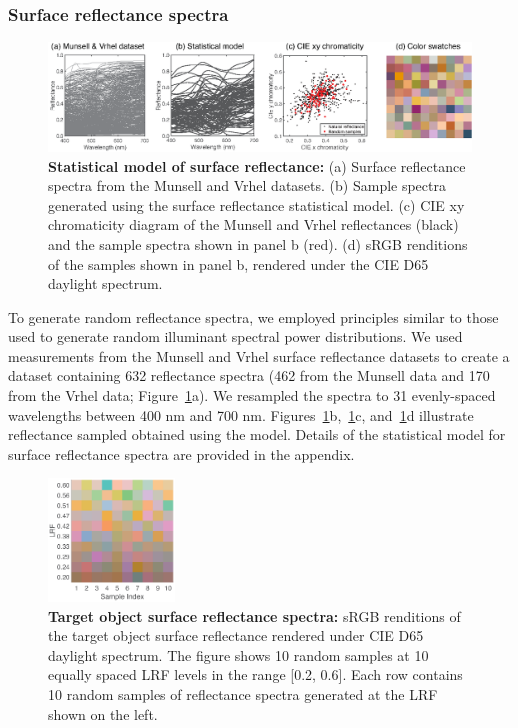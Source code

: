 \documentclass{jov}
\begin{document}
\subsubsection{Surface reflectance spectra}
\begin{figure}
\centering
    \includegraphics{Figure7.eps}
    \caption{{\bf Statistical model of surface reflectance:} (a) Surface reflectance spectra from the Munsell and Vrhel datasets. (b) Sample spectra generated using the surface reflectance statistical model. (c) CIE xy chromaticity diagram of the Munsell and Vrhel reflectances (black) and the sample spectra shown in panel b (red). (d) sRGB renditions of the samples shown in panel b, rendered under the CIE D65 daylight spectrum.}
\label{fig:surfaceReflectanceGeneration}
\end{figure}

To generate random reflectance spectra, we employed principles similar to those used to generate random illuminant spectral power distributions.
We used measurements from the Munsell \cite{kelly1943tristimulus} and Vrhel \cite{vrhel1994measurement} surface reflectance datasets to create a dataset containing 632 reflectance spectra (462 from the Munsell data and 170 from the Vrhel data; Figure~\ref{fig:surfaceReflectanceGeneration}a).
We resampled the spectra to 31 evenly-spaced wavelengths between 400 nm and 700 nm.
Figures~\ref{fig:surfaceReflectanceGeneration}b,~\ref{fig:surfaceReflectanceGeneration}c, and~\ref{fig:surfaceReflectanceGeneration}d illustrate reflectance sampled obtained using the model. 
Details of the statistical model for surface reflectance spectra are provided in the appendix. 

\begin{figure}
\centering
\includegraphics[width=0.3\textwidth]{Figure8.eps}
\caption{{\bf Target object surface reflectance spectra:} sRGB renditions of the target object surface reflectance rendered under CIE D65 daylight spectrum. The figure shows 10 random samples at 10 equally spaced LRF levels in the range [0.2, 0.6]. Each row contains 10 random samples of reflectance spectra generated at the LRF shown on the left.}
\label{fig:targetSwatches}
\end{figure}
\end{document}
